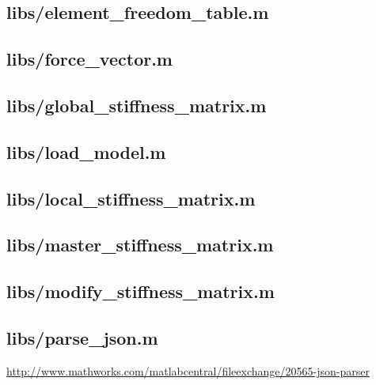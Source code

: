 \documentclass{article}
\begin{document}
\begin{appendices}
\subsection{libs/element\_freedom\_table.m}\label{app:libs/element_freedom_table.m}


\subsection{libs/force\_vector.m}\label{app:libs/force_vector.m}


\subsection{libs/global\_stiffness\_matrix.m}\label{app:libs/global_stiffness_matrix.m}


\subsection{libs/load\_model.m}\label{app:libs/load_model.m}


\subsection{libs/local\_stiffness\_matrix.m}\label{app:libs/local_stiffness_matrix.m}


\subsection{libs/master\_stiffness\_matrix.m}\label{app:libs/master_stiffness_matrix.m}


\subsection{libs/modify\_stiffness\_matrix.m}\label{app:libs/modify_stiffness_matrix.m}


\subsection{libs/parse\_json.m}\label{app:libs/parse_json.m}
\url{http://www.mathworks.com/matlabcentral/fileexchange/20565-json-parser}


\end{appendices}
\end{document}
